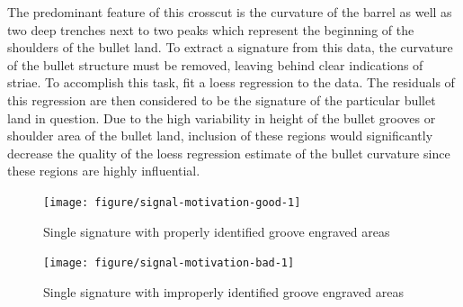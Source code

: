 \documentclass[12pt]{article}\usepackage[]{graphicx}\usepackage[]{color}
\newenvironment{knitrout}{}{} %
\theoremstyle{nonumberplain}
\begin{document}
The predominant feature of this crosscut is the curvature of the barrel as well as two deep trenches next to two peaks which represent the beginning of the shoulders of the bullet land. To extract a signature from this data, the curvature of the bullet structure must be removed, leaving behind clear indications of striae. To accomplish this task, \cite{hare2017} fit a loess regression to the data. The residuals of this regression are then considered to be the signature of the particular bullet land in question. Due to the high variability in height of the bullet grooves or shoulder area of the bullet land, inclusion of these regions would significantly decrease the quality of the loess regression estimate of the bullet curvature since these regions are highly influential. 


\begin{knitrout}
\color{fgcolor}\begin{figure}

{\centering \texttt{[image: figure/signal-motivation-good-1]} 

}

\caption[Single signature with properly identified groove engraved areas]{Single signature with properly identified groove engraved areas}\label{fig:signal-motivation-good}
\end{figure}


\end{knitrout}


\begin{knitrout}
\color{fgcolor}\begin{figure}

{\centering \texttt{[image: figure/signal-motivation-bad-1]} 

}

\caption[Single signature with improperly identified groove engraved areas]{Single signature with improperly identified groove engraved areas}\label{fig:signal-motivation-bad}
\end{figure}


\end{knitrout}


\end{document}
